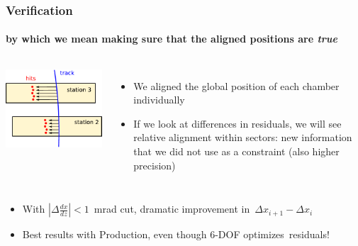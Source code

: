 \documentclass[compress]{beamer}
\begin{document}
\begin{frame}
\frametitle{Verification}
\framesubtitle{by which we mean making sure that the aligned positions are {\it true}}

\begin{columns}
\includegraphics[width=\linewidth]{residuals_difference.pdf}

\begin{itemize}
\item We aligned the global position of each chamber individually
\item If we look at differences in residuals, we will see relative
  alignment within sectors: new information that we did not use as a
  constraint (also higher precision)
\end{itemize}
\end{columns}

\begin{itemize}
\item With $|\Delta \frac{dx}{dz}| < 1$~mrad cut, dramatic improvement \mbox{in ${\Delta x}_{i+1} - {\Delta x}_i$\hspace{-1 cm}}
\item Best results with Production, even though 6-DOF \mbox{optimizes residuals!\hspace{-1 cm}}
\end{itemize}


\end{frame}
\end{document}
